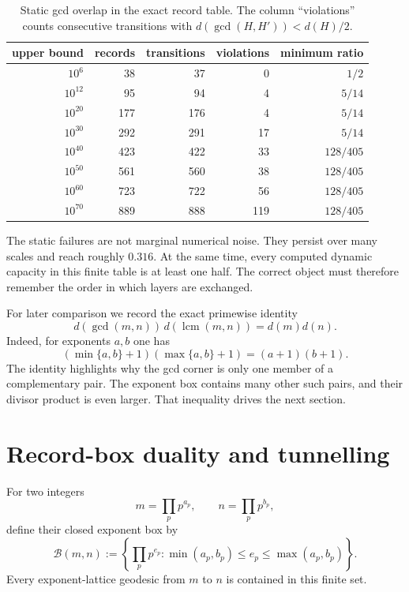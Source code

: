 \documentclass[11pt]{article}
\numberwithin{equation}{section}
\theoremstyle{blueplain}
\theoremstyle{bluedef}
\newcommand{\Bcal}{\mathcal B}
\begin{document}
\begin{table}[t]
\centering
\caption{Static gcd overlap in the exact record table.  The column ``violations'' counts consecutive transitions with $d(\gcd(H,H'))<d(H)/2$.}
\label{tab:gcd-stress}
\small
\begin{tabular}{@{}rrrrr@{}}
\toprule
upper bound & records & transitions & violations & minimum ratio \\
\midrule
$10^6$    & 38  & 37  & 0   & $1/2$ \\
$10^{12}$ & 95  & 94  & 4   & $5/14$ \\
$10^{20}$ & 177 & 176 & 4   & $5/14$ \\
$10^{30}$ & 292 & 291 & 17  & $5/14$ \\
$10^{40}$ & 423 & 422 & 33  & $128/405$ \\
$10^{50}$ & 561 & 560 & 38  & $128/405$ \\
$10^{60}$ & 723 & 722 & 56  & $128/405$ \\
$10^{70}$ & 889 & 888 & 119 & $128/405$ \\
\bottomrule
\end{tabular}
\end{table}

The static failures are not marginal numerical noise.  They persist over many scales and reach roughly $0.316$.  At the same time, every computed dynamic capacity in this finite table is at least one half.  The correct object must therefore remember the order in which layers are exchanged.

For later comparison we record the exact primewise identity
\begin{equation}
 d(\gcd(m,n))\,d(\operatorname{lcm}(m,n))=d(m)d(n).
 \label{eq:gcd-lcm-identity}
\end{equation}
Indeed, for exponents $a,b$ one has
\[
 (\min\{a,b\}+1)(\max\{a,b\}+1)=(a+1)(b+1).
\]
The identity highlights why the gcd corner is only one member of a complementary pair.  The exponent box contains many other such pairs, and their divisor product is even larger.  That inequality drives the next section.

\section{Record-box duality and tunnelling}
\label{sec:record-box}

For two integers
\[
 m=\prod_p p^{a_p},
 \qquad
 n=\prod_p p^{b_p},
\]
define their closed exponent box by
\begin{equation}
 \Bcal(m,n):=
 \left\{\prod_p p^{e_p}:\min(a_p,b_p)\le e_p\le\max(a_p,b_p)\right\}.
 \label{eq:record-box-definition}
\end{equation}
Every exponent-lattice geodesic from $m$ to $n$ is contained in this finite set.
\end{document}

